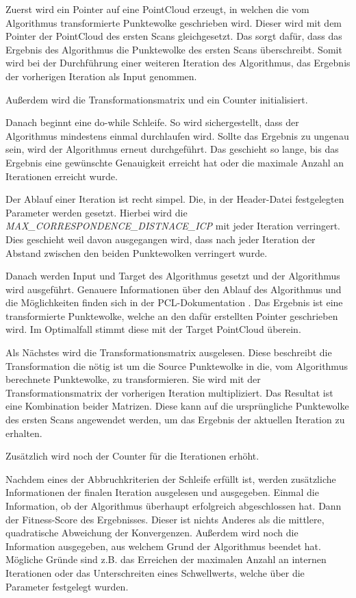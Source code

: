 Zuerst wird ein Pointer auf eine PointCloud erzeugt, in welchen die vom Algorithmus transformierte Punktewolke geschrieben wird.
Dieser wird mit dem Pointer der PointCloud des ersten Scans gleichgesetzt.
Das sorgt dafür, dass das Ergebnis des Algorithmus die Punktewolke des ersten Scans überschreibt.
Somit wird bei der Durchführung einer weiteren Iteration des Algorithmus, das Ergebnis der vorherigen Iteration als Input genommen.

Außerdem wird die Transformationsmatrix und ein Counter initialisiert.

Danach beginnt eine do-while Schleife.
So wird sichergestellt, dass der Algorithmus mindestens einmal durchlaufen wird.
Sollte das Ergebnis zu ungenau sein, wird der Algorithmus erneut durchgeführt.
Das geschieht so lange, bis das Ergebnis eine gewünschte Genauigkeit erreicht hat 
oder die maximale Anzahl an Iterationen erreicht wurde.

Der Ablauf einer Iteration ist recht simpel.
Die, in der Header-Datei festgelegten Parameter werden gesetzt.
Hierbei wird die \textit{MAX\_CORRESPONDENCE\_DISTNACE\_ICP} mit jeder Iteration verringert.
Dies geschieht weil davon ausgegangen wird, dass nach jeder Iteration der Abstand zwischen den beiden Punktewolken verringert wurde.

Danach werden Input und Target des Algorithmus gesetzt und der Algorithmus wird ausgeführt.
Genauere Informationen über den Ablauf des Algorithmus und die Möglichkeiten finden sich in der PCL-Dokumentation \cite{pcl2024icp}.
Das Ergebnis ist eine transformierte Punktewolke, welche an den dafür erstellten Pointer geschrieben wird.
Im Optimalfall stimmt diese mit der Target PointCloud überein.

Als Nächstes wird die Transformationsmatrix ausgelesen.
Diese beschreibt die Transformation die nötig ist um die Source Punktewolke in die, 
vom Algorithmus berechnete Punktewolke, zu transformieren.
Sie wird mit der Transformationsmatrix der vorherigen Iteration multipliziert.
Das Resultat ist eine Kombination beider Matrizen.
Diese kann auf die ursprüngliche Punktewolke des ersten Scans angewendet werden, 
um das Ergebnis der aktuellen Iteration zu erhalten.

Zusätzlich wird noch der Counter für die Iterationen erhöht.
\newline

Nachdem eines der Abbruchkriterien der Schleife erfüllt ist, werden zusätzliche Informationen der finalen Iteration ausgelesen und ausgegeben.
Einmal die Information, ob der Algorithmus überhaupt erfolgreich abgeschlossen hat.
Dann der Fitness-Score des Ergebnisses. 
Dieser ist nichts Anderes als die mittlere, quadratische Abweichung der Konvergenzen.
Außerdem wird noch die Information ausgegeben, aus welchem Grund der Algorithmus beendet hat.
Mögliche Gründe sind z.B. das Erreichen der maximalen Anzahl an internen Iterationen
oder das Unterschreiten eines Schwellwerts, welche über die Parameter festgelegt wurden.

